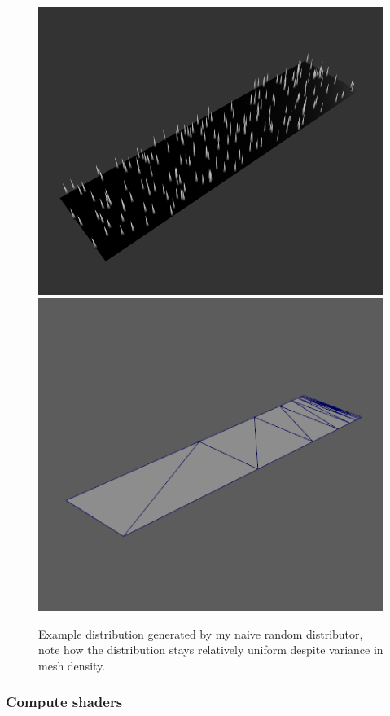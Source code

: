 \documentclass[]{acmsiggraph}
\begin{document}
\begin{figure}[htbp]
\centering
\includegraphics[width=0.49\linewidth]{images/triangleStripDistribution}
\hfill
\includegraphics[width=0.45\linewidth]{images/triangleMesh}
\caption{\label{figure:distribution} Example distribution generated by my naive random distributor, note how the distribution stays relatively uniform despite variance in mesh density.}
\end{figure}



\subsubsection{Compute shaders} \label{sec:compute shaders}
\end{document}
